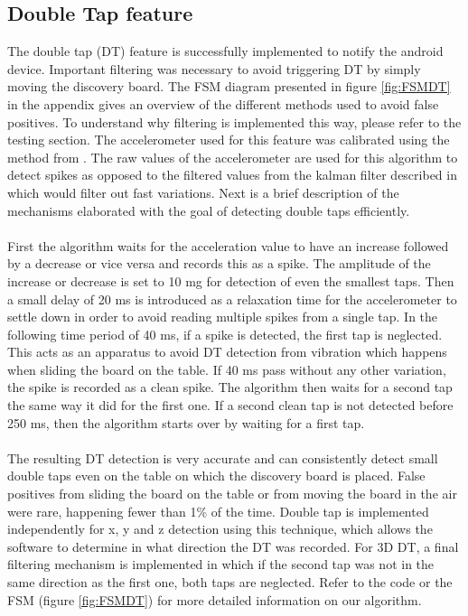 \documentclass[12pt]{article}
\begin{document}
\subsection{Double Tap feature}
The double tap (DT) feature is successfully implemented to notify the android device. Important filtering was necessary to avoid triggering DT by simply moving the discovery board. The FSM diagram presented in figure \ref{fig:FSMDT} in the appendix gives an overview of the different methods used to avoid false positives. To understand why filtering is implemented this way, please refer to the testing section. The accelerometer used for this feature was calibrated using the method from \cite{Lab4report}. The raw values of the accelerometer are used for this algorithm to detect spikes as opposed to the filtered values from the kalman filter described in \cite{Lab2report} which would filter out fast variations. Next is a brief description of the mechanisms elaborated with the goal of detecting double taps efficiently.
\paragraph{}
First the algorithm waits for the acceleration value to have an increase followed by a decrease or vice versa and records this as a spike. The amplitude of the increase or decrease is set to 10 mg for detection of even the smallest taps. Then a small delay of 20 ms is introduced as a relaxation time for the accelerometer to settle down in order to avoid reading multiple spikes from a single tap. In the following time period of 40 ms, if a spike is detected, the first tap is neglected. This acts as an apparatus to avoid DT detection from vibration which happens when sliding the board on the table. If 40 ms pass without any other variation, the spike is recorded as a clean spike. The algorithm then waits for a second tap the same way it did for the first one. If a second clean tap is not detected before 250 ms, then the algorithm starts over by waiting for a first tap.
\paragraph{}
The resulting DT detection is very accurate and can consistently detect small double taps even on the table on which the discovery board is placed. False positives from sliding the board on the table or from moving the board in the air were rare, happening fewer than 1\% of the time.
Double tap is implemented independently for x, y and z detection using this technique, which allows the software to determine in what direction the DT was recorded. For 3D DT, a final filtering mechanism is implemented in which if the second tap was not in the same direction as the first one, both taps are neglected. Refer to the code or the FSM (figure \ref{fig:FSMDT}) for more detailed information on our algorithm.
\end{document}
